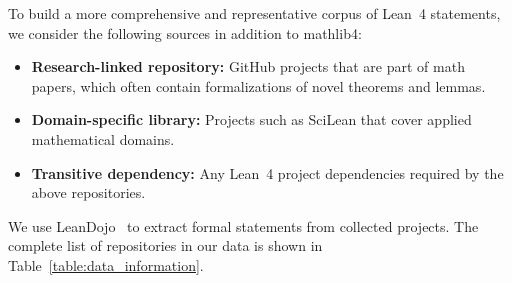 \documentclass{article} %
\begin{document}
To build a more comprehensive and representative corpus of Lean~4 statements, we consider the following sources in addition to mathlib4:
\begin{itemize}[leftmargin=*]%
    \item \textbf{Research-linked repository:} GitHub projects that are part of math papers, which often contain formalizations of novel theorems and lemmas.
    \item \textbf{Domain-specific library:} Projects such as SciLean that cover applied mathematical domains.
    \item \textbf{Transitive dependency:} Any Lean~4 project dependencies required by the above repositories.
\end{itemize}

We use LeanDojo~\citep{yang2023leandojo} to extract formal statements from collected projects.
The complete list of repositories in our data is shown in Table~\ref{table:data_information}.
\end{document}
